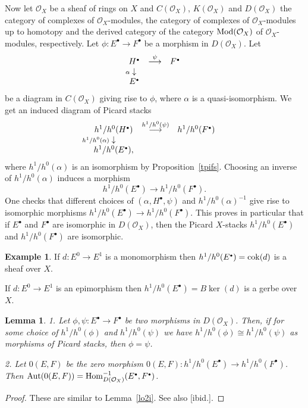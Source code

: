 \documentclass[11pt]{article}
\theoremstyle{plain}
\newtheorem{lem}[prop]{Lemma}
\theoremstyle{definition}
\newtheorem{examplep}{Example}\renewcommand{\theexamplep}{}
\newenvironment{example}{\begin{examplep}\normalfont}{\end{examplep}}
\newenvironment{pf}{\begin{proof}}{\end{proof}}
\newcommand{\com}{^{\scriptscriptstyle\bullet}}
\renewcommand{\O}{{\mathcal{O}}}
\newcommand{\Mod}{\mathop{\rm Mod}\nolimits}
\newcommand{\cok}{\mathop{\rm cok}}
\newcommand{\Hom}{\mathop{\rm Hom}\nolimits}
\newcommand{\Aut}{\mathop{\rm Aut}\nolimits}
\newcommand{\ldiag}[1]
       {\makebox[0cm]{\({\scriptstyle#1}\downarrow\phantom{\scriptstyle#1}\)}}
\providecommand{\Aut}{\operatorname{Aut}}
\theoremstyle{plain}
\theoremstyle{definition}
\theoremstyle{remark}
\begin{document}
Now let \(\O_X\) be a sheaf of rings on \(X\) and \(C(\O_X)\), \(K(\O_X)\) and
\(D(\O_X)\)
the category of complexes of \(\O_X\)-modules, the category of complexes of
\(\O_X\)-modules up to homotopy and the derived category of the category
\(\Mod(\O_X)\) of \(\O_X\)-modules, respectively. Let
\(\phi:E\com\rightarrow F\com\) be a morphism in \(D(\O_X)\). Let
\[
\begin{array}{ccc} H\com & \stackrel{\psi}{\longrightarrow} & F\com \\
\ldiag{\alpha} & & \\ E\com & &
\end{array}
\]
be a diagram in \(C(\O_X)\) giving rise to \(\phi\), where \(\alpha\)
is a quasi-isomorphism. We get an induced diagram of Picard stacks
\[
\begin{array}{ccc} h^1/h^0(H\com) & \stackrel{h^1/h^0(\psi)}{\longrightarrow}
& h^1/h^0(F\com) \\
\ldiag{h^1/h^0(\alpha)} & & \\ h^1/h^0(E\com), & &
\end{array}
\]
where \(h^1/h^0(\alpha)\) is an isomorphism by
Proposition~\ref{tpifs}. Choosing an inverse of
\(h^1/h^0(\alpha)\) induces a morphism
\[
h^1/h^0(E\com)\longrightarrow h^1/h^0(F\com).
\]
One checks that different
choices of \((\alpha, H\com,\psi)\) and \(h^1/h^0(\alpha)^{-1}\) give rise
to isomorphic morphisms \(h^1/h^0(E\com)\rightarrow
h^1/h^0(F\com)\). This proves in particular that if \(E\com\) and \(F\com\)
are isomorphic in \(D(\O_X)\), then the Picard \(X\)-stacks
\(h^1/h^0(E\com)\) and \(h^1/h^0(F\com)\) are isomorphic.

\begin{example}
If \(d:E^0\rightarrow E^1\) is a monomorphism then
\(h^1/h^0(E\com)=\cok(d)\) is a sheaf over \(X\).

If \(d:E^0\rightarrow E^1\) is an epimorphism then
\(h^1/h^0(E\com)=B\ker(d)\) is a gerbe over \(X\).
\end{example}

\begin{lem} \label{lmh}
1. Let \(\phi,\psi:E\com\to F\com\) be two morphisms in \(D(\O_X)\). Then,
if for some choice of \(h^1/h^0(\phi)\) and \(h^1/h^0(\psi)\) we have
\(h^1/h^0(\phi)\cong h^1/h^0(\psi)\) as morphisms of Picard stacks, then
\(\phi=\psi\).

2. Let \(0(E,F)\) be the zero morphism \(0(E,F):h^1/h^0(E\com)\to
h^1/h^0(F\com)\). Then \(\Aut(0(E,F))=\Hom^{-1}_{D(\O_X)}(E\com,F\com)\).
\end{lem}
\begin{pf}
These are similar to Lemma~\ref{lo2i}. See also [ibid.].
\end{pf}
\end{document}
